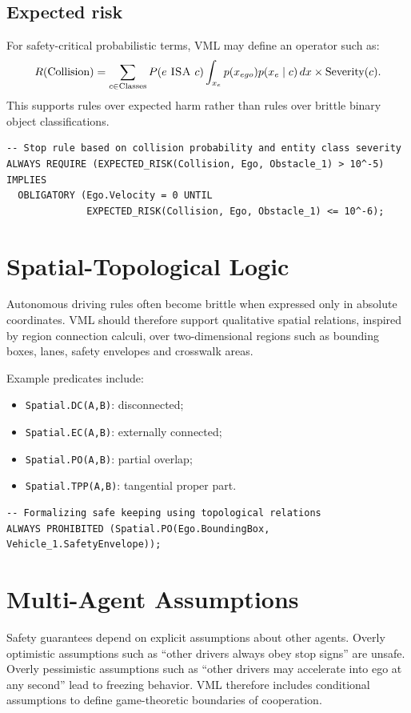 \documentclass[11pt,a4paper]{article}
\newcommand{\VML}{\textsc{VML}}
\begin{document}
\subsection{Expected risk}
For safety-critical probabilistic terms, \VML{} may define an operator such as:
\[
  R(\text{Collision}) = \sum_{c \in \text{Classes}} P(e\ \textsc{ISA}\ c) \int_{x_e} p(x_{ego})p(x_e\mid c)\,dx \times \text{Severity}(c).
\]
This supports rules over expected harm rather than rules over brittle binary object classifications.

\begin{verbatim}
-- Stop rule based on collision probability and entity class severity
ALWAYS REQUIRE (EXPECTED_RISK(Collision, Ego, Obstacle_1) > 10^-5)
IMPLIES
  OBLIGATORY (Ego.Velocity = 0 UNTIL
              EXPECTED_RISK(Collision, Ego, Obstacle_1) <= 10^-6);
\end{verbatim}

\section{Spatial-Topological Logic}
Autonomous driving rules often become brittle when expressed only in absolute coordinates. \VML{} should therefore support qualitative spatial relations, inspired by region connection calculi, over two-dimensional regions such as bounding boxes, lanes, safety envelopes and crosswalk areas.

Example predicates include:
\begin{itemize}
  \item \texttt{Spatial.DC(A,B)}: disconnected;
  \item \texttt{Spatial.EC(A,B)}: externally connected;
  \item \texttt{Spatial.PO(A,B)}: partial overlap;
  \item \texttt{Spatial.TPP(A,B)}: tangential proper part.
\end{itemize}

\begin{verbatim}
-- Formalizing safe keeping using topological relations
ALWAYS PROHIBITED (Spatial.PO(Ego.BoundingBox, Vehicle_1.SafetyEnvelope));
\end{verbatim}

\section{Multi-Agent Assumptions}
Safety guarantees depend on explicit assumptions about other agents. Overly optimistic assumptions such as ``other drivers always obey stop signs'' are unsafe. Overly pessimistic assumptions such as ``other drivers may accelerate into ego at any second'' lead to freezing behavior. \VML{} therefore includes conditional assumptions to define game-theoretic boundaries of cooperation.
\end{document}
